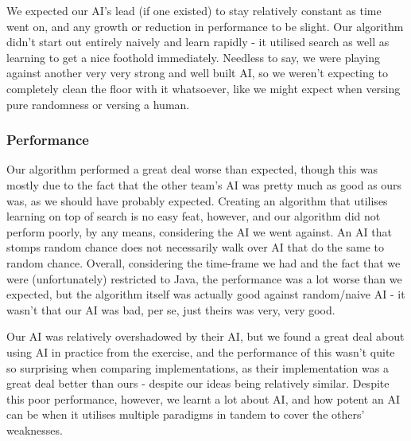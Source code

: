 \documentclass[11pt]{article}
\begin{document}
We expected our AI's lead (if one existed) to stay relatively constant as time went on, and any growth or reduction in performance to be slight. Our algorithm didn't start out entirely naively and learn rapidly - it utilised search as well as learning to get a nice foothold immediately. Needless to say, we were playing against another very very strong and well built AI, so we weren't expecting to completely clean the floor with it whatsoever, like we might expect when versing pure randomness or versing a human.
\subsubsection{Performance}
\label{sec-3-3-2}

Our algorithm performed a great deal worse than expected, though this was mostly due to the fact that the other team's AI was pretty much as good as ours was, as we should have probably expected. Creating an algorithm that utilises learning on top of search is no easy feat, however, and our algorithm did not perform poorly, by any means, considering the AI we went against. An AI that stomps random chance does not necessarily walk over AI that do the same to random chance. Overall, considering the time-frame we had and the fact that we were (unfortunately) restricted to Java, the performance was a lot worse than we expected, but the algorithm itself was actually good against random/naive AI - it wasn't that our AI was bad, per se, just theirs was very, very good.

Our AI was relatively overshadowed by their AI, but we found a great deal about using AI in practice from the exercise, and the performance of this wasn't quite so surprising when comparing implementations, as their implementation was a great deal better than ours - despite our ideas being relatively similar. Despite this poor performance, however, we learnt a lot about AI, and how potent an AI can be when it utilises multiple paradigms in tandem to cover the others' weaknesses.
\end{document}
